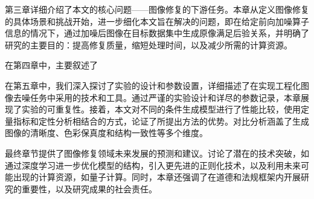 第三章详细介绍了本文的核心问题——图像修复的下游任务。本章从定义图像修复的具体场景和挑战开始，进一步细化本文旨在解决的问题，即在给定前向加噪算子信息的情况下，通过加噪后图像在目标数据集中生成原像满足后验关系，并明确了研究的主要目的：提高修复质量，缩短处理时间，以及减少所需的计算资源。


在第四章中，主要叙述了

在第五章中，我们深入探讨了实验的设计和参数设置，详细描述了在实现工程化图像去噪任务中采用的技术和工具。通过严谨的实验设计和详尽的参数记录，本章展现了实验的可重复性。接着，本文对不同的条件生成模型进行了性能比较，使用定量指标和定性分析相结合的方式，论证了所提出方法的优势。对比分析涵盖了生成图像的清晰度、色彩保真度和结构一致性等多个维度。   

最终章节提供了图像修复领域未来发展的预测和建议。讨论了潜在的技术突破，如通过深度学习进一步优化模型的结构，引入更先进的正则化技术，以及利用未来可能出现的计算资源，如量子计算。同时，本章还强调了在道德和法规框架内开展研究的重要性，以及研究成果的社会责任。 


